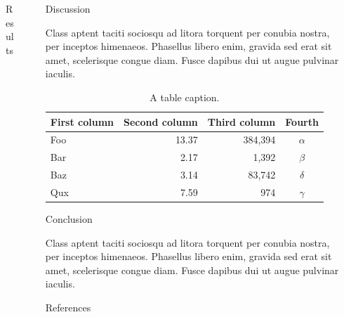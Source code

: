 \documentclass[final]{beamer}
\newlength{\sepwidth}
\newlength{\colwidth}
\newcommand{\separatorcolumn}{\begin{column}{\sepwidth}\end{column}}
\begin{document}
\begin{frame}[t]
\begin{columns}[t]
\begin{column}{\colwidth}
\begin{block}{Results}
        \end{block}

      \end{column}

      \separatorcolumn

      \begin{column}{\colwidth}

        \begin{block}{Discussion}

          Class aptent taciti sociosqu ad litora torquent per conubia nostra, per
          inceptos himenaeos. Phasellus libero enim, gravida sed erat sit amet,
          scelerisque congue diam. Fusce dapibus dui ut augue pulvinar iaculis.

          \begin{table}
            \centering
            \begin{tabular}{l r r c}
              \toprule
              \textbf{First column} & \textbf{Second column} & \textbf{Third column} & \textbf{Fourth} \\
              \midrule
              Foo & 13.37 & 384,394 & $\alpha$ \\
              Bar & 2.17 & 1,392 & $\beta$ \\
              Baz & 3.14 & 83,742 & $\delta$ \\
              Qux & 7.59 & 974 & $\gamma$ \\
              \bottomrule
            \end{tabular}
            \caption{A table caption.}
          \end{table}


        \end{block}

        \begin{block}{Conclusion}

          Class aptent taciti sociosqu ad litora torquent per conubia nostra, per
          inceptos himenaeos. Phasellus libero enim, gravida sed erat sit amet,
          scelerisque congue diam. Fusce dapibus dui ut augue pulvinar iaculis.

        \end{block}

        \begin{block}{References}

          \nocite{*}
          \footnotesize{}

        \end{block}  
      \end{column}

      \separatorcolumn
    \end{columns}
  \end{frame}
\end{document}
